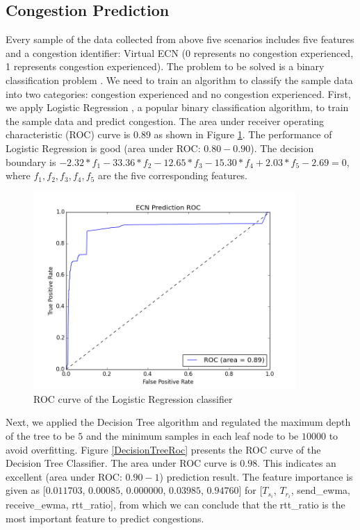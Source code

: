 \subsection{Congestion Prediction}
\label{CongestionPredict}
\par Every sample of the data collected from above five scenarios includes five features and a congestion identifier: Virtual ECN (0 represents no congestion experienced, 1 represents congestion experienced). The problem to be solved is a binary classification problem \cite{alpaydin2014introduction}. We need to train an algorithm to classify the sample data into two categories: congestion experienced and no congestion experienced. First, we apply Logistic Regression \cite{hosmer2013applied}, a popular binary classification algorithm, to train the sample data and predict congestion. The area under receiver operating characteristic (ROC) curve \cite{hanley1982meaning} is $0.89$ as shown in Figure \ref{LRRoc}. The performance of Logistic Regression is good (area under ROC: $0.80 - 0.90$). The decision boundary is $ -2.32*f_{1} - 33.36*f_{2} - 12.65*f_{3} - 15.30*f_{4} + 2.03*f_{5} - 2.69 = 0$, where $f_{1}, f_{2}, f_{3}, f_{4}, f_{5}$ are the five corresponding features.
\begin{figure}
\centering
\includegraphics[width=10cm]{LRRoc.png}
\caption{ROC curve of the Logistic Regression classifier}
\label{LRRoc}
\end{figure}




\par Next, we applied the Decision Tree algorithm \cite{rokach2014data} and regulated the maximum depth of the tree to be $5$ and the minimum samples in each leaf node to be $10000$ to avoid overfitting. Figure \ref{DecisionTreeRoc} presents the ROC curve of the Decision Tree Classifier. The area under ROC curve is $0.98$. This indicates an excellent (area under ROC: $0.90 - 1$) prediction result. The feature importance is given as [$0.011703$, $0.00085$, $0.000000$, $0.03985$, $0.94760$] for [$T_{s_{i}}$, $T_{r_{i}}$, send\_ewma, receive\_ewma, rtt\_ratio], from which we can conclude that the rtt\_ratio is the most important feature to predict congestions. 

